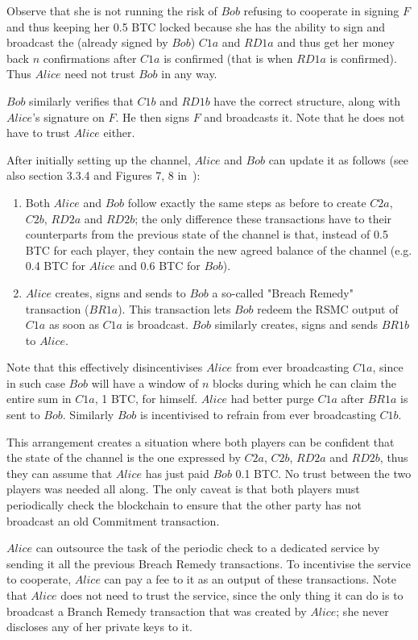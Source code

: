 \begin{enumerate}
    Observe that she is not running the risk of $Bob$ refusing to cooperate in signing $F$
    and thus keeping her 0.5 BTC locked because she has the ability to sign and broadcast
    the (already signed by $Bob$) $C1a$ and $RD1a$ and thus get her money back $n$
    confirmations after $C1a$ is confirmed (that is when $RD1a$ is confirmed). Thus
    $Alice$ need not trust $Bob$ in any way.

    $Bob$ similarly verifies that $C1b$ and $RD1b$ have the correct structure, along with
    $Alice$'s signature on $F$. He then signs $F$ and broadcasts it. Note that he does not
    have to trust $Alice$ either.
  \end{enumerate}

  After initially setting up the channel, $Alice$ and $Bob$ can update it as follows (see
  also section 3.3.4 and Figures 7, 8 in~\cite{lightning}):
  \begin{enumerate}
    \item Both $Alice$ and $Bob$ follow exactly the same steps as before to create $C2a$,
    $C2b$, $RD2a$ and $RD2b$; the only difference these transactions have to their
    counterparts from the previous state of the channel is that, instead of 0.5 BTC for
    each player, they contain the new agreed balance of the channel (e.g. 0.4 BTC for
    $Alice$ and 0.6 BTC for $Bob$).

    \item $Alice$ creates, signs and sends to $Bob$ a so-called "Breach Remedy"
    transaction ($BR1a$). This transaction lets $Bob$ redeem the RSMC output of $C1a$ as
    soon as $C1a$ is broadcast. $Bob$ similarly creates, signs and sends $BR1b$ to
    $Alice$.
  \end{enumerate}
  Note that this effectively disincentivises $Alice$ from ever broadcasting $C1a$,
  since in such case $Bob$ will have a window of $n$ blocks during which he can claim the
  entire sum in $C1a$, 1 BTC, for himself. $Alice$ had better purge $C1a$ after $BR1a$ is
  sent to $Bob$. Similarly $Bob$ is incentivised to refrain from ever broadcasting $C1b$.

  This arrangement creates a situation where both players can be confident that the state
  of the channel is the one expressed by $C2a$, $C2b$, $RD2a$ and $RD2b$, thus they can
  assume that $Alice$ has just paid $Bob$ 0.1 BTC. No trust between the two players was
  needed all along. The only caveat is that both players must periodically check the
  blockchain to ensure that the other party has not broadcast an old Commitment
  transaction.

  $Alice$ can outsource the task of the periodic check to a dedicated service by sending
  it all the previous Breach Remedy transactions. To incentivise the service to cooperate,
  $Alice$ can pay a fee to it as an output of these transactions. Note that $Alice$ does
  not need to trust the service, since the only thing it can do is to broadcast a Branch
  Remedy transaction that was created by $Alice$; she never discloses any of her private
  keys to it.

